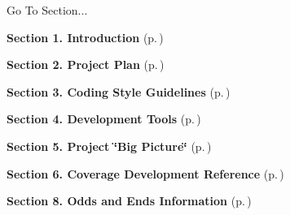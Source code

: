 \begin{Desc}
\item[Go To Section...]\par
\begin{CompactItemize}
\item 
{\bf Section 1.  Introduction} {\rm (p.\,\pageref{page_intro})}\item 
{\bf Section 2.  Project Plan} {\rm (p.\,\pageref{page_project_plan})}\item 
{\bf Section 3.  Coding Style Guidelines} {\rm (p.\,\pageref{page_code_style})}\item 
{\bf Section 4.  Development Tools} {\rm (p.\,\pageref{page_tools})}\item 
{\bf Section 5.  Project \char`\"{}Big Picture\char`\"{}} {\rm (p.\,\pageref{page_big_picture})}\item 
{\bf Section 6.  Coverage Development Reference} {\rm (p.\,\pageref{page_code_details})}\item 
{\bf Section 8.  Odds and Ends Information} {\rm (p.\,\pageref{page_misc})}\end{CompactItemize}
\end{Desc}
